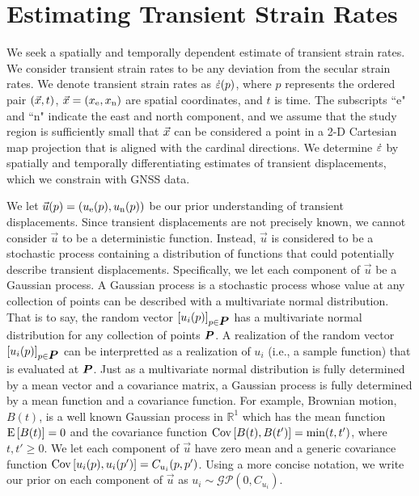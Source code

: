 \documentclass[extra,mreferee]{gji}
\begin{document}
\section{Estimating Transient Strain Rates}\label{sec:Method}


We seek a spatially and temporally dependent estimate of transient
strain rates. We consider transient strain rates to be any deviation
from the secular strain rates. We denote transient strain rates as
$\dot\varepsilon(p)$, where $p$ represents the ordered pair $(\vec{x},t)$, $\vec{x}
= (x_{\mathrm{e}},x_{\mathrm{n}})$ are spatial coordinates, and $t$ is time. The
subscripts ``e" and ``n" indicate the east and north component, and we
assume that the study region is sufficiently small that $\vec{x}$ can be
considered a point in a 2-D Cartesian map projection that is aligned
with the cardinal directions. We determine $\dot\varepsilon$ by spatially and
temporally differentiating estimates of transient displacements, which
we constrain with GNSS data.


We let $\vec{u}(p) = (u_{\mathrm{e}}(p),u_{\mathrm{n}}(p))$ be our prior understanding of
transient displacements. Since transient displacements are not
precisely known, we cannot consider $\vec{u}$ to be a deterministic
function. Instead, $\vec{u}$ is considered to be a stochastic process
containing a distribution of functions that could potentially describe
transient displacements. Specifically, we let each component of
$\vec{u}$ be a Gaussian process. A Gaussian process is a stochastic
process whose value at any collection of points can be described with
a multivariate normal distribution. That is to say, the random vector
$[u_i(p)]_{p \in \points}$ has a multivariate normal distribution for
any collection of points $\points$. A realization of the random vector
$[u_i(p)]_{p \in \points}$ can be interpretted as a realization of
$u_i$ (i.e., a sample function) that is evaluated at $\points$. Just
as a multivariate normal distribution is fully determined by a mean
vector and a covariance matrix, a Gaussian process is fully determined
by a mean function and a covariance function. For example, Brownian
motion, $B(t)$, is a well known Gaussian process in $\mathbb{R}^1$
which has the mean function $\mathrm{E}\left[ B(t) \right] = 0$ and the covariance function
$\mathrm{Cov}\left[ B(t),B(t') \right] = \min(t,t')$, where $t,t' \ge 0$. We let each
component of $\vec{u}$ have zero mean and a generic covariance
function $\mathrm{Cov}\left[ u_i(p),u_i(p') \right] = C_{u_i}(p,p')$. Using a more concise
notation, we write our prior on each component of $\vec{u}$ as $u_i
\sim \mathcal{GP}\left(0,C_{u_i}\right)$.
\end{document}
